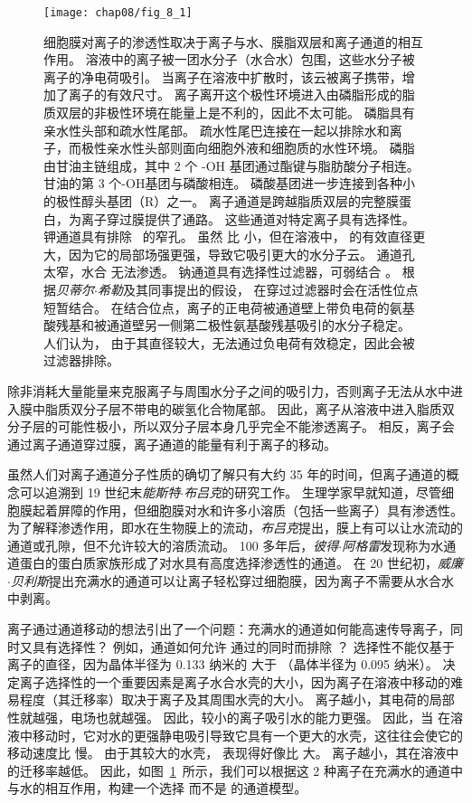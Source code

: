 \begin{figure}[htbp]
	\centering
	\texttt{[image: chap08/fig\_8\_1]}
	\caption{细胞膜对离子的渗透性取决于离子与水、膜脂双层和离子通道的相互作用。
		溶液中的离子被一团水分子（水合水）包围，这些水分子被离子的净电荷吸引。
		当离子在溶液中扩散时，该云被离子携带，增加了离子的有效尺寸。
		离子离开这个极性环境进入由磷脂形成的脂质双层的非极性环境在能量上是不利的，因此不太可能。
		磷脂具有亲水性头部和疏水性尾部。
		疏水性尾巴连接在一起以排除水和离子，而极性亲水性头部则面向细胞外液和细胞质的水性环境。
		磷脂由甘油主链组成，其中 2 个 -OH 基团通过酯键与脂肪酸分子相连。
		甘油的第 3 个-OH基团与磷酸相连。
		磷酸基团进一步连接到各种小的极性醇头基团（R）之一。
		离子通道是跨越脂质双层的完整膜蛋白，为离子穿过膜提供了通路。
		这些通道对特定离子具有选择性。
		钾通道具有排除~ 的窄孔。
		虽然  比  小，但在溶液中， 的有效直径更大，因为它的局部场强更强，导致它吸引更大的水分子云。
		 通道孔太窄，水合  无法渗透。
		钠通道具有选择性过滤器，可弱结合 。
		根据\textit{贝蒂尔$\cdot$希勒}及其同事提出的假设， 在穿过过滤器时会在活性位点短暂结合。
		在结合位点，离子的正电荷被通道壁上带负电荷的氨基酸残基和被通道壁另一侧第二极性氨基酸残基吸引的水分子稳定。
		人们认为， 由于其直径较大，无法通过负电荷有效稳定，因此会被过滤器排除。}
	\label{fig:8_1}
\end{figure}


除非消耗大量能量来克服离子与周围水分子之间的吸引力，否则离子无法从水中进入膜中脂质双分子层不带电的碳氢化合物尾部。
因此，离子从溶液中进入脂质双分子层的可能性极小，所以双分子层本身几乎完全不能渗透离子。
相反，离子会通过离子通道穿过膜，离子通道的能量有利于离子的移动。


虽然人们对离子通道分子性质的确切了解只有大约 35 年的时间，但离子通道的概念可以追溯到 19 世纪末\textit{能斯特$\cdot$布吕克}的研究工作。
生理学家早就知道，尽管细胞膜起着屏障的作用，但细胞膜对水和许多小溶质（包括一些离子）具有渗透性。
为了解释渗透作用，即水在生物膜上的流动，\textit{布吕克}提出，膜上有可以让水流动的通道或孔隙，但不允许较大的溶质流动。
100 多年后，\textit{彼得$\cdot$阿格雷}发现称为水通道蛋白的蛋白质家族形成了对水具有高度选择渗透性的通道。
在 20 世纪初，\textit{威廉$\cdot$贝利斯}提出充满水的通道可以让离子轻松穿过细胞膜，因为离子不需要从水合水中剥离。


离子通过通道移动的想法引出了一个问题：充满水的通道如何能高速传导离子，同时又具有选择性？
例如，通道如何允许  通过的同时而排除 ？
选择性不能仅基于离子的直径，因为晶体半径为 0.133 纳米的  大于 （晶体半径为 0.095 纳米）。
决定离子选择性的一个重要因素是离子水合水壳的大小，因为离子在溶液中移动的难易程度（其迁移率）取决于离子及其周围水壳的大小。
离子越小，其电荷的局部性就越强，电场也就越强。
因此，较小的离子吸引水的能力更强。
因此，当  在溶液中移动时，它对水的更强静电吸引导致它具有一个更大的水壳，这往往会使它的移动速度比  慢。
由于其较大的水壳， 表现得好像比  大。
离子越小，其在溶液中的迁移率越低。
因此，如图~\ref{fig:8_1}~所示，我们可以根据这 2 种离子在充满水的通道中与水的相互作用，构建一个选择  而不是  的通道模型。



